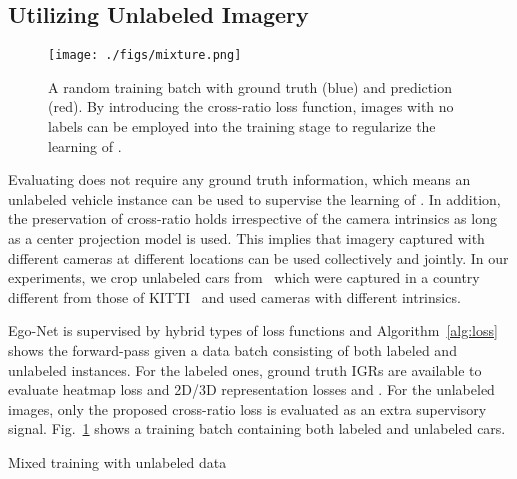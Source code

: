 \documentclass[final]{cvpr}
\begin{document}
\subsection{Utilizing Unlabeled Imagery}
\begin{figure}[h]
	\begin{center}
\texttt{[image: ./figs/mixture.png]}
	\end{center}
	\caption{A random training batch with ground truth  (blue) and prediction  (red). By introducing the cross-ratio loss function, images with no labels can be employed into the training stage to regularize the learning of .}
\label{fig:mixture}
\end{figure}
Evaluating  does not require any ground truth information, which means an unlabeled vehicle instance can be used to supervise the learning of . In addition, the preservation of cross-ratio holds irrespective of the camera intrinsics as long as a center projection model is used. This implies that imagery captured with different cameras at different locations can be used collectively and jointly. In our experiments, we crop unlabeled cars from~\cite{song2019apollocar3d} which were captured in a country different from those of KITTI~\cite{geiger2012we} and used cameras with different intrinsics. 

Ego-Net is supervised by hybrid types of loss functions and Algorithm~\ref{alg:loss} shows the forward-pass given a data batch consisting of both labeled and unlabeled instances. For the labeled ones, ground truth IGRs are available to evaluate heatmap loss  and 2D/3D representation losses  and . For the unlabeled images, only the proposed cross-ratio loss  is evaluated as an extra supervisory signal. Fig.~\ref{fig:mixture} shows a training batch containing both labeled and unlabeled cars. 

\begin{algorithm}
	\footnotesize
	\SetAlgoLined
	{\; \; \;}
	\For{j=1:}
	{\;}
	\;  
	\; 
	\;	 
	\; 			
		
\caption{Mixed training with unlabeled data}
\label{alg:loss}
\end{algorithm}
\end{document}
